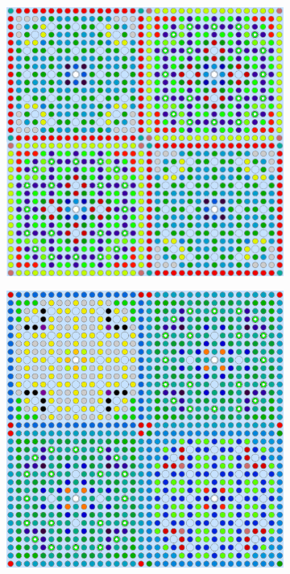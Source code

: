 \documentclass[12pt,twoside]{mitthesis-exec}
\begin{document}
\begin{figure}[h!]
\begin{subfigure}{0.47\textwidth}
  \caption{}
  \label{fig:reflector-degenerate}
\end{subfigure}
\begin{subfigure}{0.47\textwidth}
  \centering
  \includegraphics[width=0.85\linewidth]{figures/patterns/lns/2x2/materials}
  \caption{}
  \label{fig:2x2-lns}
\end{subfigure}%
\begin{subfigure}{0.47\textwidth}
  \centering
  \includegraphics[width=0.85\linewidth]{figures/patterns/lns/reflector/materials}
  \caption{}

\end{subfigure}
\end{figure}
\end{document}
